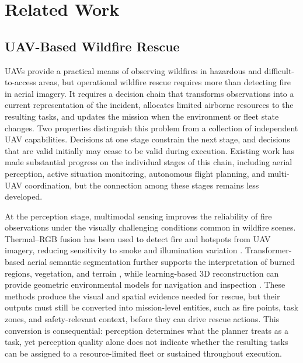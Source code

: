 \section{Related Work}

\subsection{UAV-Based Wildfire Rescue}

UAVs provide a practical means of observing wildfires in hazardous and
difficult-to-access areas, but operational wildfire rescue requires more than
detecting fire in aerial imagery. It requires a decision chain that transforms
observations into a current representation of the incident, allocates limited
airborne resources to the resulting tasks, and updates the mission when the
environment or fleet state changes. Two properties distinguish this problem
from a collection of independent UAV capabilities. Decisions at one stage
constrain the next stage, and decisions that are valid initially may cease to be
valid during execution. Existing work has made substantial progress on the
individual stages of this chain, including aerial perception, active situation
monitoring, autonomous flight planning, and multi-UAV coordination, but the
connection among these stages remains less developed.

At the perception stage, multimodal sensing improves the reliability of fire
observations under the visually challenging conditions common in wildfire
scenes. Thermal--RGB fusion has been used to detect fire and hotspots from UAV
imagery, reducing sensitivity to smoke and illumination variation
\cite{yuan2021uavfire}. Transformer-based aerial semantic segmentation further
supports the interpretation of burned regions, vegetation, and terrain
\cite{zhang2022uavtransformer}, while learning-based 3D reconstruction can
provide geometric environmental models for navigation and inspection
\cite{yang2022uav3dreconstruction}. These methods produce the visual and
spatial evidence needed for rescue, but their outputs must still be converted
into mission-level entities, such as fire points, task zones, and safety-relevant
context, before they can drive rescue actions. This conversion is consequential:
perception determines what the planner treats as a task, yet perception quality
alone does not indicate whether the resulting tasks can be assigned to a
resource-limited fleet or sustained throughout execution.

